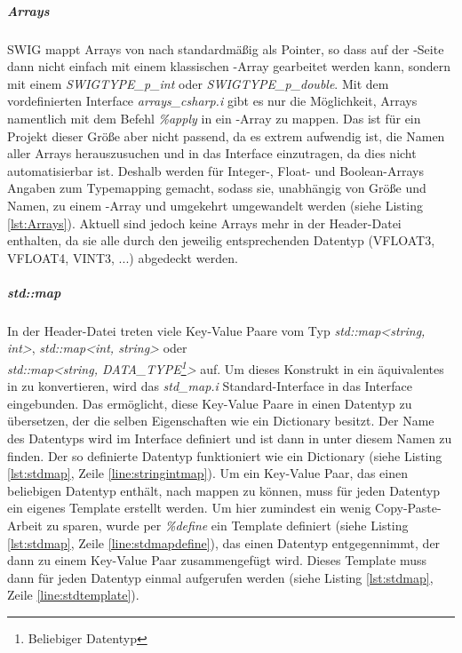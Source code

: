 \subparagraph{Arrays}
SWIG mappt Arrays von \CC nach \CS standardmäßig als Pointer, so dass auf der \CS-Seite dann nicht einfach mit einem klassischen \CS-Array gearbeitet werden kann, sondern mit einem \emph{SWIGTYPE\_p\_int} oder \emph{SWIGTYPE\_p\_double}. Mit dem vordefinierten Interface \emph{arrays\_csharp.i} gibt es nur die Möglichkeit, Arrays namentlich mit dem Befehl \emph{\%apply} in ein \CS-Array zu mappen. Das ist für ein Projekt dieser Größe aber nicht passend, da es extrem aufwendig ist, die Namen aller Arrays herauszusuchen und in das Interface einzutragen, da dies nicht automatisierbar ist. Deshalb werden für Integer-, Float- und Boolean-Arrays Angaben zum Typemapping gemacht, sodass sie, unabhängig von Größe und Namen, zu einem \CS-Array und umgekehrt umgewandelt werden (siehe Listing \ref{lst:Arrays}). Aktuell sind jedoch keine Arrays mehr in der Header-Datei enthalten, da sie alle durch den jeweilig entsprechenden Datentyp (VFLOAT3, VFLOAT4, VINT3, ...) abgedeckt werden.

\begin{code}[caption={Beispiel Arraymapping},label={lst:Arrays}, escapechar=|]
\end{code}

\subparagraph{std::map}

In der Header-Datei treten viele Key-Value Paare vom Typ
\emph{std::map<string, int>}, \emph{std::map<int, string>} oder\\
 \emph{std::map<string, DATA\_TYPE\footnote{Beliebiger Datentyp}>} auf. Um dieses Konstrukt in ein äquivalentes in \CS zu konvertieren, wird das \emph{std\_map.i} Standard-Interface in das Interface eingebunden. Das ermöglicht, diese Key-Value Paare in einen Datentyp zu übersetzen, der die selben Eigenschaften wie ein \CS Dictionary besitzt. Der Name des Datentyps wird im Interface definiert und ist dann in \CS unter diesem Namen zu finden. Der so definierte Datentyp funktioniert wie ein Dictionary (siehe Listing \ref{lst:stdmap}, Zeile \ref{line:stringintmap}). Um ein Key-Value Paar, das einen beliebigen Datentyp enthält, nach \CS mappen zu können, muss für jeden Datentyp ein eigenes Template erstellt werden. Um hier zumindest ein wenig Copy-Paste-Arbeit zu sparen, wurde per \emph{\%define} ein Template definiert (siehe Listing \ref{lst:stdmap}, Zeile \ref{line:stdmapdefine}), das einen Datentyp entgegennimmt, der dann zu einem Key-Value Paar zusammengefügt wird. Dieses Template muss dann für jeden Datentyp einmal aufgerufen werden (siehe Listing \ref{lst:stdmap}, Zeile \ref{line:stdtemplate}). 

